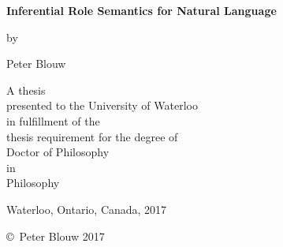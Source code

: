 \pagestyle{empty}

\begin{titlepage}
        \begin{center}
        \vspace*{1.0cm}

        \Huge
        {\bf Inferential Role Semantics for Natural Language}

        \vspace*{1.0cm}

        \normalsize
        by \\

        \vspace*{1.0cm}

        \Large
        Peter Blouw \\

        \vspace*{3.0cm}

        \normalsize
        A thesis \\
        presented to the University of Waterloo \\ 
        in fulfillment of the \\
        thesis requirement for the degree of \\
        Doctor of Philosophy \\
        in \\
        Philosophy \\

        \vspace*{2.0cm}

        Waterloo, Ontario, Canada, 2017 \\

        \vspace*{1.0cm}

        \copyright\ Peter Blouw 2017 \\
        \end{center}
\end{titlepage}

\pagestyle{plain}
\setcounter{page}{2}

